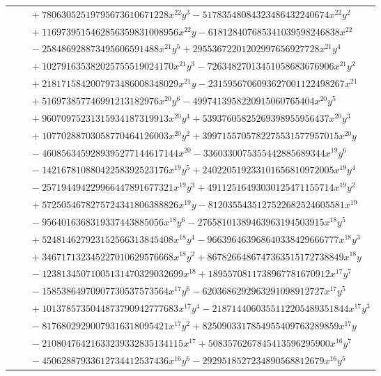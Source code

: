 \documentclass[11pt]{article}
\begin{document}
\begin{longtable}{@{}ll@{}}
 & $\quad +78063052519795673610671228x^{22}y^{3}-51783548084323486432240674x^{22}y^{2}$\\
 & $\quad +1169739515462856359831008956x^{22}y-618128407685341039598246838x^{22}$\\
 & $\quad -258486928873495606591488x^{21}y^{5}+29553672201202997656927728x^{21}y^{4}$\\
 & $\quad +102791635382025755519024170x^{21}y^{3}-72634827013451058683676906x^{21}y^{2}$\\
 & $\quad +2181715842007973486008348029x^{21}y-2315956706093627001122498267x^{21}$\\
 & $\quad +516973857746991213182976x^{20}y^{6}-4997413958220915060765404x^{20}y^{5}$\\
 & $\quad +96070975231315934187319913x^{20}y^{4}+53937605825269398955956437x^{20}y^{3}$\\
 & $\quad +10770288703058770464126003x^{20}y^{2}+3997155705782275531577957015x^{20}y$\\
 & $\quad -4608563459289395277144617144x^{20}-3360330075355442885689344x^{19}y^{6}$\\
 & $\quad -14216781088042258392523176x^{19}y^{5}+240220519233101656810972005x^{19}y^{4}$\\
 & $\quad -257194494229966447891677321x^{19}y^{3}+49112516493030125471155714x^{19}y^{2}$\\
 & $\quad +5725054678275724341806388826x^{19}y-8120355435127522682524605581x^{19}$\\
 & $\quad -9564016368319337443885056x^{18}y^{6}-27658101389463963194503915x^{18}y^{5}$\\
 & $\quad +524814627923152566313845408x^{18}y^{4}-966396463968640338429666777x^{18}y^{3}$\\
 & $\quad +346717132345227010629576668x^{18}y^{2}+8678266486747363515172738849x^{18}y$\\
 & $\quad -12381345071005131470329032699x^{18}+1895570811738967781670912x^{17}y^{7}$\\
 & $\quad -15853864970907730537573564x^{17}y^{6}-6203686292963291098912727x^{17}y^{5}$\\
 & $\quad +1013785735044873790942777683x^{17}y^{4}-2187144060355112205489351844x^{17}y^{3}$\\
 & $\quad -81768029290079316318095421x^{17}y^{2}+8250903317854955409763289859x^{17}y$\\
 & $\quad -21080476421633239332835134115x^{17}+5083576267845413596295900x^{16}y^{7}$\\
 & $\quad -45062887933612734412537436x^{16}y^{6}-2929518527234890568812679x^{16}y^{5}$\\

\end{longtable}
\end{document}
